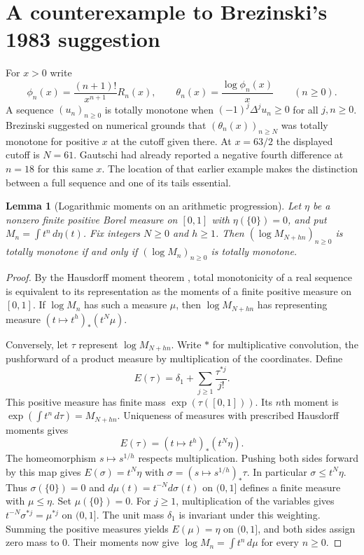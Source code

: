 \documentclass[11pt,a4paper]{article}
\newtheorem{lemma}[theorem]{Lemma}
\begin{document}
\section{A counterexample to Brezinski's 1983 suggestion}
\label{sec:rigidity}

For $x>0$ write
\[
 \phi_n(x)=\frac{(n+1)!}{x^{n+1}}R_n(x),
 \qquad \theta_n(x)=\frac{\log\phi_n(x)}x \qquad(n\ge0).
\]
A sequence $(u_n)_{n\ge0}$ is totally monotone when
$(-1)^j\Delta^j u_n\ge0$ for all $j,n\ge0$. Brezinski
\cite[p.~88]{brezinski} suggested on numerical grounds that
$(\theta_n(x))_{n\ge N}$ was totally monotone for positive $x$
at the cutoff given there. At $x=63/2$ the displayed cutoff is
$N=61$. Gautschi \cite[p.~48]{gautschi} had already reported
a negative fourth difference at $n=18$ for this same $x$.
The location of that earlier example makes the distinction between
a full sequence and one of its tails essential.

\begin{lemma}[Logarithmic moments on an arithmetic progression]
\label{lem:rigidity}
Let $\eta$ be a nonzero finite positive Borel measure on $[0,1]$
with $\eta(\{0\})=0$, and put $M_n=\int t^n\,d\eta(t)$.
Fix integers $N\ge0$ and $h\ge1$. Then
$(\log M_{N+hn})_{n\ge0}$ is totally monotone if and only if
$(\log M_n)_{n\ge0}$ is totally monotone.
\end{lemma}

\begin{proof}
By the Hausdorff moment theorem \cite{hausdorff}, total monotonicity
of a real sequence is equivalent to its representation as the moments
of a finite positive measure on $[0,1]$. If $\log M_n$ has such
a measure $\mu$, then $\log M_{N+hn}$ has representing measure
$(t\mapsto t^h)_*(t^N\mu)$.

Conversely, let $\tau$ represent $\log M_{N+hn}$. Write $*$ for
multiplicative convolution, the pushforward of a product measure
by multiplication of the coordinates. Define
\[
 E(\tau)=\delta_1+\sum_{j\ge1}\frac{\tau^{*j}}{j!}.
\]
This positive measure has finite mass $\exp(\tau([0,1]))$.
Its $n$th moment is $\exp(\int t^n\,d\tau)=M_{N+hn}$.
Uniqueness of measures with prescribed Hausdorff moments gives
\[
 E(\tau)=(t\mapsto t^h)_*(t^N\eta).
\]
The homeomorphism $s\mapsto s^{1/h}$ respects multiplication. Pushing
both sides forward by this map gives $E(\sigma)=t^N\eta$ with
$\sigma=(s\mapsto s^{1/h})_*\tau$. In particular
$\sigma\le t^N\eta$. Thus $\sigma(\{0\})=0$ and
$d\mu(t)=t^{-N}d\sigma(t)$ on $(0,1]$ defines a finite measure with
$\mu\le\eta$. Set $\mu(\{0\})=0$.
For $j\ge1$, multiplication of the variables gives
$t^{-N}\sigma^{*j}=\mu^{*j}$ on $(0,1]$. The unit mass $\delta_1$
is invariant under this weighting. Summing the positive measures yields
$E(\mu)=\eta$ on $(0,1]$, and both sides assign zero mass to $0$.
Their moments now give $\log M_n=\int t^n\,d\mu$ for every $n\ge0$.
\end{proof}
\end{document}
